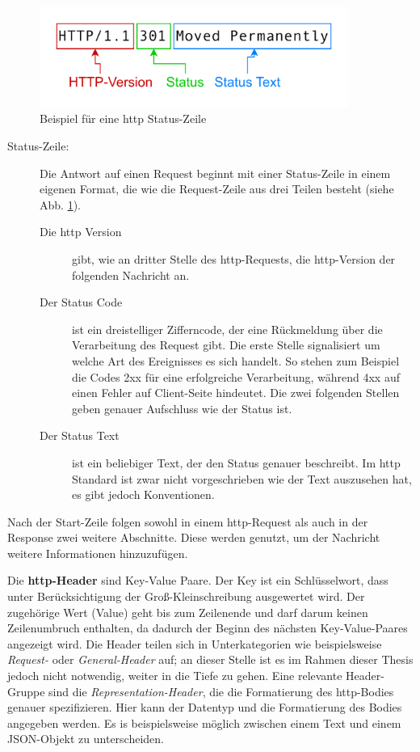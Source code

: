 \begin{figure}[!hbt]
     \centering
     \includegraphics[width=0.9\textwidth]{./images/HTTP-Statusline.png}
     \caption{Beispiel für eine \ac{http} Status-Zeile}
     \label{fig:http-statusline}
 \end{figure}


\begin{description}
     \item[Status-Zeile:] Die Antwort auf einen Request beginnt mit einer Status-Zeile in einem eigenen Format, die wie die Request-Zeile aus drei Teilen besteht (siehe Abb. \ref{fig:http-statusline}).
     \begin{description}
          \item[Die \ac{http} Version] gibt, wie an dritter Stelle des \ac{http}-Requests, die \ac{http}-Version der folgenden Nachricht an.
          \item[Der Status Code] ist ein dreistelliger Zifferncode, der eine Rückmeldung über die Verarbeitung des Request gibt. 
          Die erste Stelle signalisiert um welche Art des Ereignisses es sich handelt.
          So stehen zum Beispiel die Codes 2xx für eine erfolgreiche Verarbeitung, während 4xx auf einen Fehler auf Client-Seite hindeutet.
          Die zwei folgenden Stellen geben genauer Aufschluss wie der Status ist\cite{HTTPResponseStatus2023}.
          \item[Der Status Text] ist ein beliebiger Text, der den Status genauer beschreibt.
          Im \ac{http} Standard ist zwar nicht vorgeschrieben wie der Text auszusehen hat, es gibt jedoch Konventionen\cite{HTTPResponseStatus2023}.
     \end{description}
\end{description}

Nach der Start-Zeile folgen sowohl in einem \ac{http}-Request als auch in der Response zwei weitere Abschnitte. 
Diese werden genutzt, um der Nachricht weitere Informationen hinzuzufügen.

Die \textbf{\ac{http}-Header} sind Key-Value Paare. 
Der Key ist ein Schlüsselwort, dass unter Berücksichtigung der Groß-Kleinschreibung ausgewertet wird. 
Der zugehörige Wert (Value) geht bis zum Zeilenende und darf darum keinen Zeilenumbruch enthalten, da dadurch der Beginn des nächsten Key-Value-Paares angezeigt wird.
Die Header teilen sich in Unterkategorien wie beispielsweise \textit{Request-} oder \textit{General-Header} auf; an dieser Stelle ist es im Rahmen dieser Thesis jedoch nicht notwendig, weiter in die Tiefe zu gehen.
Eine relevante Header-Gruppe sind die \textit{Representation-Header}, die die Formatierung des \ac{http}-Bodies genauer spezifizieren.
Hier kann der Datentyp und die Formatierung des Bodies angegeben werden.
Es is beispielsweise möglich zwischen einem Text und einem JSON-Objekt zu unterscheiden.


